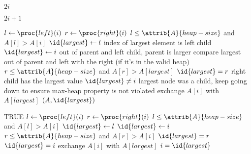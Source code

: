 \documentclass[12pt]{article}
\begin{document}
\begin{codebox}
\li \Return $2i$
\end{codebox}

\begin{codebox}
\li \Return $2i + 1$
\end{codebox}

\begin{codebox}
\li $l \gets \proc{left}(i)$
\li $r \gets \proc{right}(i)$
\li \If $l \leq \attrib{A}{heap-size}$ and $A[l] > A[i]$
\li     \Then
            $\id{largest} \gets l$ \Comment index of largest element is left child
\li     \Else
\li         $\id{largest} \gets i$ \Comment out of parent and left child, parent is larger
    \End
\li \Comment compare largest out of parent and left with the right (if it's in the valid heap)
\li \If $r \leq \attrib{A}{heap-size}$ and $A[r] > A[largest]$
\li     \Then
            $\id{largest} = r$ \Comment right child has the largest value
        \End
\li \If $\id{largest} \neq i$
\li     \Then 
            \Comment largest node was a child, keep going down to ensure max-heap property is not violated
\li         exchange $A[i]$ with $A[largest]$
\li         {}$(A, \id{largest})$
        \End
\end{codebox}

\begin{codebox}
\li \While TRUE
\li \Do
        $l \gets \proc{left}(i)$
\li     $r \gets \proc{right}(i)$
\li     \If $l \leq \attrib{A}{heap-size}$ and $A[l] > A[i]$
\li         \Then
                $\id{largest} \gets l$
\li         \Else
\li             $\id{largest} \gets i$
            \End
\li     \If $r \leq \attrib{A}{heap-size}$ and $A[r] > A[i]$
\li         \Then
                $\id{largest} = r$
            \End
\li     \If $\id{largest} = i$
\li         \Then
                \Return
            \End
\li     exchange $A[i]$ with $A[largest]$
\li     $i = \id{largest}$
    \End
\end{codebox}
\end{document}
